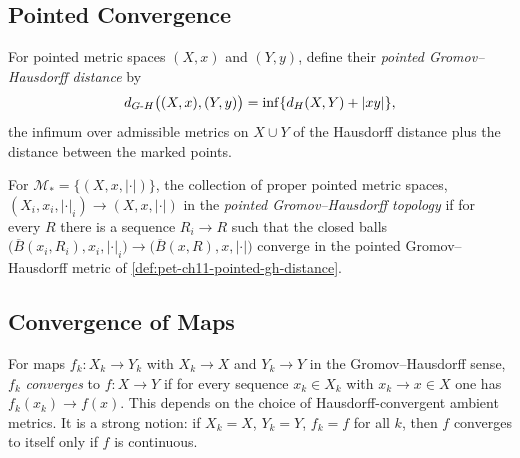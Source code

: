 \subsection{Pointed Convergence}

\begin{definition}
  \label{def:pet-ch11-pointed-gh-distance}

  For pointed metric spaces $(X,x)$ and $(Y,y)$, define their \emph{pointed
  Gromov--Hausdorff distance} by
  \[
    d_{G\text{-}H}\big((X,x),(Y,y)\big)=\inf\{d_H(X,Y)+|xy|\},
  \]
  the infimum over admissible metrics on $X\cup Y$ of the Hausdorff distance
  plus the distance between the marked points.
\end{definition}

\begin{definition}
  \label{def:pet-ch11-pointed-gh-topology}

  For $\mathcal{M}_*=\{(X,x,|\cdot|)\}$, the collection of proper pointed
  metric spaces, $(X_i,x_i,|\cdot|_i)\to(X,x,|\cdot|)$ in the \emph{pointed
  Gromov--Hausdorff topology} if for every $R$ there is a sequence $R_i\to R$
  such that the closed balls
  $\big(\overline{B}(x_i,R_i),x_i,|\cdot|_i\big)\to\big(\overline{B}(x,R),x,|\cdot|\big)$
  converge in the pointed Gromov--Hausdorff metric of
  \cref{def:pet-ch11-pointed-gh-distance}.
\end{definition}

\subsection{Convergence of Maps}

\begin{definition}
  \label{def:pet-ch11-convergence-of-maps}

  For maps $f_k:X_k\to Y_k$ with $X_k\to X$ and $Y_k\to Y$ in the
  Gromov--Hausdorff sense,
  $f_k$ \emph{converges} to $f:X\to Y$ if for every sequence $x_k\in X_k$
  with $x_k\to x\in X$ one has $f_k(x_k)\to f(x)$. This depends on the choice
  of Hausdorff-convergent ambient metrics. It is a strong notion: if
  $X_k=X$, $Y_k=Y$, $f_k=f$ for all $k$, then $f$ converges to itself only if
  $f$ is continuous.
\end{definition}


